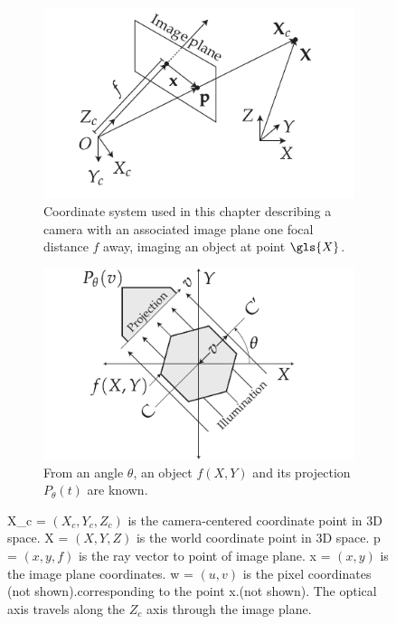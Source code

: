 \begin{figure}
    \centering
    \begin{subfigure}[t]{0.475\textwidth}
        \centering
        \includegraphics{coordinate_system}
        \caption[Coordinate system]{Coordinate system used in this chapter describing a camera with an associated \gls{image plane} one focal distance \(f\) away, imaging an object at point \(\gls{X}\).
        }\label{fig:coordinate_system_flopt}
    \end{subfigure}\hfill
    \begin{subfigure}[t]{0.475\textwidth}
      \centering
      \includegraphics{Chapters/flopt/Figs/PDF/OPT_digram}
      \caption[Principle of OPT]{From an angle \(\theta\), an object \(f(X,Y)\) and its projection \(P_\theta(t)\) are known.}\label{fig:OPT_digram}
    \end{subfigure}
    \caption[Coordinates and \gls{OPT}]{\gls{X_c} = \((X_c,Y_c,Z_c)\) is the camera-centered coordinate point in \gls{3D} space.
            \gls{X} = \((X,Y,Z)\) is the world coordinate point in \gls{3D} space.
            \gls{p} = \((x,y,f)\) is the ray vector to point of \gls{image plane}.
            \gls{x} = \((x,y)\) is the \gls{image plane} coordinates.
            \gls{w} = \((u,v)\) is the pixel coordinates (not shown).corresponding to the point \gls{x}.(not shown).
            The optical axis travels along the \(Z_c\) axis through the \gls{image plane}.}
\end{figure}


